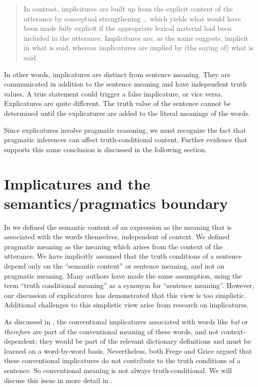 \begin{quote}
In contrast, implicitures are built up from the explicit content of the utterance by conceptual strengthening … which yields what would have been made fully explicit if the appropriate lexical material had been included in the utterance. Implicitures are, as the name suggests, implicit in what is said, whereas implicatures are implied by (the saying of) what is said. 
\end{quote}


In other words, implicatures are distinct from sentence meaning. They are communicated in addition to the sentence meaning and have independent truth values. A true statement could trigger a false implicature, or vice versa. Explicatures are quite different. The truth value of the sentence cannot be determined until the explicatures are added to the literal meanings of the words.



Since explicatures involve pragmatic reasoning, we must recognize the fact that pragmatic inferences can affect truth-conditional content. Further evidence that supports this same conclusion is discussed in the following section.


\section{Implicatures and the semantics/pragmatics boundary}\label{sec:} %

In  we defined the semantic content of an expression as the meaning that is associated with the words themselves, independent of context. We defined pragmatic meaning as the meaning which arises from the context of the utterance. We have implicitly assumed that the truth conditions of a sentence depend only on the “semantic content” or sentence meaning, and not on pragmatic meaning. Many authors have made the same assumption, using the term “truth conditional meaning” as a synonym for “sentence meaning”. However, our discussion of explicatures has demonstrated that this view is too simplistic. Additional challenges to this simplistic view arise from research on implicatures.



As discussed in , the conventional implicatures associated with words like \textit{but} or \textit{therefore} are part of the conventional meaning of these words, and not context-dependent; they would be part of the relevant dictionary definitions and must be learned on a word-by-word basis. Nevertheless, both Frege and Grice argued that these conventional implicatures do not contribute to the truth conditions of a sentence. So conventional meaning is not always truth-conditional. We will discuss this issue in more detail in .



